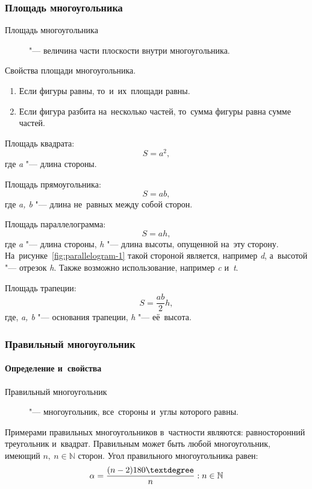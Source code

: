 \documentclass[]{scrartcl}
\begin{document}
\subsubsection{Площадь многоугольника}
\begin{description}
	\item[Площадь многоугольника] "--- величина части плоскости внутри многоугольника.
\end{description}
Свойства площади многоугольника.
\begin{enumerate}
	\item Если фигуры равны, то~и~их~площади равны.
	\item Если фигура разбита на~несколько частей, то~сумма фигуры равна сумме частей.
\end{enumerate}
Площадь квадрата:
\begin{equation}\label{eq:square-square}
S=a^2,
\end{equation}
где \textit{a} "--- длина стороны.

Площадь прямоугольника:
\begin{equation}\label{eq:rectangle-square}
S=ab,
\end{equation}
где \textit{a, b} "--- длина не~равных между собой сторон.

Площадь параллелограмма:
\begin{equation}\label{eq:parallelogram-square-1}
S=ah,
\end{equation}
где \textit{a} "--- длина стороны, \textit{h} "--- длина высоты, опущенной на~эту сторону. На~рисунке~\ref{fig:parallelogram-1} такой стороной является, например \textit{d}, а~высотой "--- отрезок \textit{h}. Также возможно использование, например \textit{c} и~\textit{t}.

Площадь трапеции:
\begin{equation}\label{eq:parallelogram-square-2}
S=\frac{ab}{2}h,
\end{equation}
где, \textit{a, b} "--- основания трапеции, \textit{h} "--- её~высота.

\subsubsection{Правильный многоугольник}
\paragraph{Определение и~свойства}
\begin{description}
	\item[Правильный многоугольник] "--- многоугольник, все~стороны и~углы которого равны.
\end{description}
Примерами правильных многоугольников в~частности являются: равносторонний треугольник и~квадрат. Правильным может быть любой многоугольник, имеющий ${\textstyle n,\ n \in \mathbb{N}}$ сторон. Угол правильного многоугольника равен:
\begin{equation}\label{eq:n-angles-inrehular-polygon}
\alpha = \frac{(n-2)180\textdegree}{n}: n \in \mathbb{N}
\end{equation}
\end{document}
